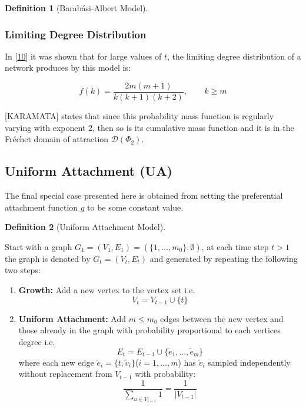 \documentclass[
  10pt,
  a4paper,
]{scrreprt}
\providecommand{\tightlist}{%
  \setlength{\itemsep}{0pt}\setlength{\parskip}{0pt}}\usepackage{longtable,booktabs,array}
\theoremstyle{definition}
\newtheorem{definition}{Definition}[section]
\theoremstyle{plain}
\theoremstyle{plain}
\theoremstyle{plain}
\theoremstyle{remark}
\begin{document}
{\begin{definition}[Barabási-Albert
Model]
\end{definition}

\hypertarget{limiting-degree-distribution-1}{%
\subsubsection{Limiting Degree
Distribution}\label{limiting-degree-distribution-1}}

In {[}\protect\hyperlink{ref-barabasibook}{10}{]} it was shown that for
large values of \(t\), the limiting degree distribution of a network
produces by this model is:

\[
f(k) = \frac{2m(m+1)}{k(k+1)(k+2)}, \qquad k\geq m
\]

{[}KARAMATA{]} states that since this probability mass function is
regularly varying with exponent 2, then so is its cumulative mass
function and it is in the Fréchet domain of attraction
\(\mathcal D(\Phi_2)\).

\hypertarget{uniform-attachment-ua}{%
\subsection{Uniform Attachment (UA)}\label{uniform-attachment-ua}}

The final special case presented here is obtained from setting the
preferential attachment function \(g\) to be some constant value.

\begin{definition}[Uniform Attachment
Model]\protect\hypertarget{def-ua}{}\label{def-ua}

Start with a graph \(G_1 = (V_1, E_1) = (\{1,\ldots,m_0\}, \emptyset)\),
at each time step \(t>1\) the graph is denoted by \(G_t=(V_t, E_t)\) and
generated by repeating the following two steps:

\begin{enumerate}
\def\labelenumi{\arabic{enumi}.}
\tightlist
\item
  \textbf{Growth:} Add a new vertex to the vertex set i.e.~\[
  V_t=V_{t-1}\cup\{t\}
  \]
\item
  \textbf{Uniform Attachment:} Add \(m\le m_0\) edges between the new
  vertex and those already in the graph with probability proportional to
  each vertices degree i.e.~\[
  E_t  = E_{t-1} \cup \{\tilde e_1, \ldots, \tilde e_m\}
  \] where each new edge
  \(\tilde e_i = \{t, \tilde v_i\}\)(\(i=1,\ldots, m\)) has
  \(\tilde v_i\) sampled independently without replacement from
  \(V_{t-1}\) with probability: \[
  \frac{1}{\sum_{u\in V_{t-1}}1} = \frac{1}{|V_{t-1}|}
  \]
\end{enumerate}


\end{definition}}
\end{document}
